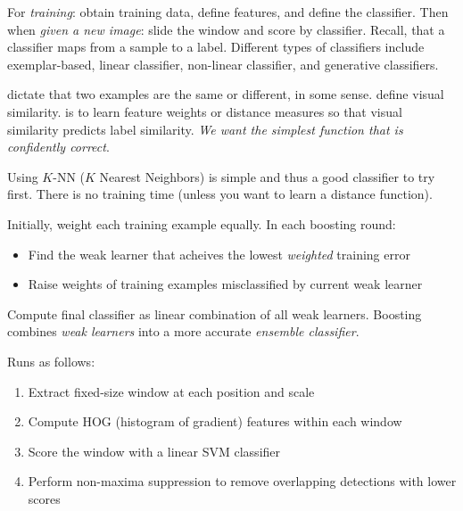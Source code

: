 \documentclass{article}
\begin{document}
For  \emph{training}: obtain training data, define features, and define the classifier. Then when \emph{given a new image}: slide the window and score by classifier. Recall, that a classifier maps from a sample to a label. Different types of classifiers include exemplar-based, linear classifier, non-linear classifier, and generative classifiers. 

\begin{remark}
   dictate that two examples are the same or different, in some sense.  define visual similarity.  is to learn feature weights or distance measures so that visual similarity predicts label similarity. \emph{We want the simplest function that is confidently correct}. 
\end{remark}

Using $K$-NN ($K$ Nearest Neighbors) is simple and thus a good classifier to try first. There is no training time (unless you want to learn a distance function). 

\begin{definition}[Boosting]
  Initially, weight each training example equally. In each boosting round: 
  \begin{itemize}
    \item Find the weak learner that acheives the lowest \emph{weighted} training error 
    \item Raise weights of training examples misclassified by current weak learner
  \end{itemize}
  Compute final classifier as linear combination of all weak learners. Boosting combines \emph{weak learners} into a more accurate \emph{ensemble classifier}. 
\end{definition}

\begin{definition}
  Runs as follows: 
  \begin{enumerate}
    \item Extract fixed-size window at each position and scale 
    \item Compute HOG (histogram of gradient) features within each window 
    \item Score the window with a linear SVM classifier 
    \item Perform non-maxima suppression to remove overlapping detections with lower scores
  \end{enumerate}
\end{definition}
\end{document}
